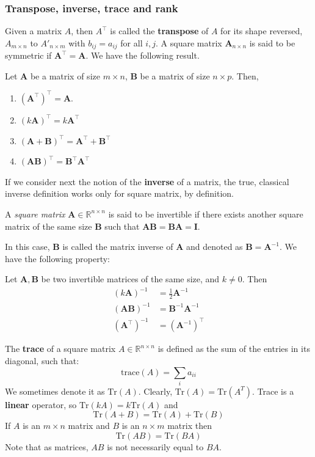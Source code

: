 \subsubsection{Transpose, inverse, trace and rank}
Given a matrix $A$, then $A^{\top}$ is called the \textbf{transpose} of $A$ for its shape reversed, $A_{m\times n}$ to $A'_{n\times m}$ with $b_{ij}=a_{ij}$ for all $i,j$. A square matrix $\mathbf{A}_{n\times n}$ is said to be symmetric if $\mathbf{A}^{\top}=\mathbf{A}$. We have the following result. 
\begin{proposition}
    Let $\mathbf{A}$ be a matrix of size $m\times n$, $\mathbf{B}$ be a matrix of size $n\times p$. Then, 
    \begin{enumerate}[itemsep=1pt,topsep=1pt]
        \item $(\mathbf{A}^{\top})^{\top}=\mathbf{A}$.
        \item $(k\mathbf{A})^{\top}=k\mathbf{A}^{\top}$
        \item $(\mathbf{A}+\mathbf{B})^{\top}=\mathbf{A}^{\top}+\mathbf{B}^{\top}$
        \item $(\mathbf{AB})^{\top}=\mathbf{B}^{\top}\mathbf{A}^{\top}$
    \end{enumerate}
\end{proposition}
If we consider next the notion of the \textbf{inverse} of a matrix, the true, classical inverse definition works only for square matrix, by definition. 
\begin{definition}
    A \textit{square matrix} $\mathbf{A}\in\mathbb{R}^{n\times n}$ is said to be invertible if there exists another square matrix of the same size $\mathbf{B}$ such that $\mathbf{AB}=\mathbf{BA}=\mathbf{I}$. 
\end{definition}
In this case, $\mathbf{B}$ is called the matrix inverse of $\mathbf{A}$ and denoted as $\mathbf{B}=\mathbf{A}^{-1}$. We have the following property: 
\begin{proposition}
    Let $\mathbf{A},\mathbf{B}$ be two invertible matrices of the same size, and $k\neq 0$. Then 
    \begin{align}
        (k\mathbf{A})^{-1} & = \frac{1}{2}\mathbf{A}^{-1}\\
        (\mathbf{AB})^{-1} & = \mathbf{B}^{-1}\mathbf{A}^{-1}\\
        (\mathbf{A}^{\top})^{-1} & = (\mathbf{A}^{-1})^{\top}
    \end{align}
\end{proposition}
The \textbf{trace} of a square matrix $A\in \mathbb{R}^{n\times n}$ is defined as the sum of the entries in its diagonal, such that: 
\begin{equation}
    \mathrm{trace}(A)=\sum_{i}a_{ii}
\end{equation}
We sometimes denote it as $\mathrm{Tr}(A)$. Clearly, $\mathrm{Tr}(A)=\mathrm{Tr}(A^{T})$. Trace is a \textbf{linear} operator, so $\mathrm{Tr}(kA)=k\mathrm{Tr}(A)$ and $$\mathrm{Tr}(A+B)=\mathrm{Tr}(A)+\mathrm{Tr}(B)$$ If $A$ is an $m\times n$ matrix and $B$ is an $n\times m$ matrix then $$\mathrm{Tr}(AB)=\mathrm{Tr}(BA)$$ Note that as matrices, $AB$ is not necessarily equal to $BA$. 

